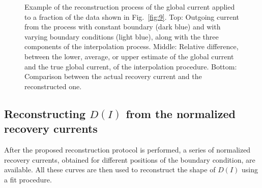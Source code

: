 {\begin{figure}[p]
    \caption{Example of the reconstruction process of the global current applied to a fraction of the data shown in Fig.~\ref{fig:9}. Top: Outgoing current from the process with constant boundary (dark blue) and with varying boundary conditions (light blue), along with the three components of the interpolation process. Middle: Relative difference, between the lower, average, or upper estimate of the global current and the true global current, of the interpolation procedure. Bottom: Comparison between the actual recovery current and the reconstructed one.}
    \label{fig:protocol}
\end{figure}


\subsection{Reconstructing $D(I)$ from the normalized recovery currents}


After the proposed reconstruction protocol is performed, a series of normalized recovery currents, obtained for different positions of the boundary condition, are available. All these curves are then used to reconstruct the shape of $D(I)$ using a fit procedure.

}

